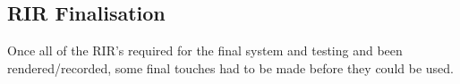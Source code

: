 \documentclass[../../main.tex]{subfiles}
\begin{document}
	\subsection{RIR Finalisation}

		Once all of the \ac{RIR}'s required for the final system and testing and been rendered/recorded, some final touches had to be made before they could be used.



\end{document}

